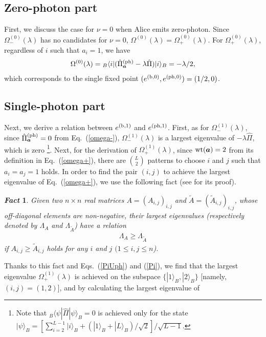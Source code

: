\documentclass[prl,twocolumn,superscriptaddress,nofootinbib]{revtex4}
\newtheorem{fact}{{\it \bf Fact}}
\def\U#1{{\rm #1}}
\newcommand{\bra}[1]{\langle #1 |}
\newcommand{\ket}[1]{| #1 \rangle}
\begin{document}
\subsection{Zero-photon part}
\label{sec:zero}
First, we discuss the case for $\nu=0$ when Alice emits zero-photon.
Since $\Omega^{(0)}_-(\lambda)$ has no candidates for $\nu=0$,
$\Omega^{(0)}(\lambda)=\Omega^{(0)}_+(\lambda)$.
For $\Omega^{(0)}_+(\lambda)$, regardless of $i$ such that $a_i=1$, we have
\begin{align}
  \Omega^{(0)}(\lambda)={}_B\bra{i}(\hat{\Pi}^{(\U{ph})}_{\bm{a}}-\lambda\hat{\Pi})\ket{i}_B=-\lambda/2,
\end{align}
which corresponds to the single fixed point $(e^{(\U{b},0)},e^{(\U{ph},0)})=(1/2,0)$. 

\subsection{Single-photon part}
\label{sec:single}
Next, we derive a relation between $e^{(\U{b},1)}$ and $e^{(\U{ph},1)}$. 
First, as for $\Omega^{(1)}_-(\lambda)$, since $\hat{\Pi}^{\U{(ph)}}_{\bm{a}}=0$ from Eq.~(\ref{omega-}),
$\Omega^{(1)}_-(\lambda)$ is a largest eigenvalue of $-\lambda\hat{\Pi}$, which is zero
\footnote{Note that
  ${}_B\bra{\psi}\hat{\Pi}\ket{\psi}_B=0$ is achieved only for the state 
$\ket{\psi}_B=[\sum^{L-1}_{i=2}\ket{i}_B+(\ket{1}_B+\ket{L}_B)/\sqrt{2}]/\sqrt{L-1}$.}. 
Next, for the derivation of $\Omega^{(1)}_+(\lambda)$, since $\U{wt}({\bm{a}})=2$ from its definition in Eq.~(\ref{omega+}), 
there are $\binom L2$ patterns to choose $i$ and $j$ such that $a_i=a_j=1$ holds. 
In order to find the pair $(i,j)$ to achieve the largest eigenvalue of Eq.~(\ref{omega+}), we use the following fact
(see \cite{Yuki2017} for its proof). 
\begin{fact}
  \label{fact1}
  Given two $n\times n$ real matrices $A=(A_{i,j})_{i,j}$ and $\tilde{A}=(\tilde{A}_{i,j})_{i,j}$,
  whose off-diagonal elements are non-negative, their largest eigenvalues 
  (respectively denoted by $\Lambda_A$ and $\Lambda_{\tilde{A}}$) have a relation
\begin{align}
  \Lambda_A\geq\Lambda_{\tilde{A}}
\end{align}
  if $A_{i,j}\geq\tilde{A}_{i,j}$ holds for any $i$ and $j$ $(1\leq i,j\leq n$).
\end{fact}
Thanks to this fact and Eqs.~(\ref{PiUph}) and (\ref{Pi}), 
we find that the largest eigenvalue $\Omega^{(1)}_+(\lambda)$ is achieved on the subspace 
$\{\ket{1}_B,\ket{2}_B\}$ [namely, $(i,j)=(1,2)$], and by calculating the largest eigenvalue of
\end{document}

